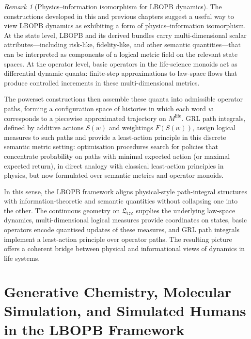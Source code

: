 \documentclass[11pt]{book}
\theoremstyle{plain}
\theoremstyle{definition}
\theoremstyle{remark}
\newtheorem{remark}[theorem]{Remark}
\newcommand{\GZLS}{\ensuremath{\mathfrak{L}_{\mathrm{GZ}}}}       \newcommand{\GZLT}{\ensuremath{M_{!w}}}                           \newcommand{\GZLOC}{\ensuremath{A_M}}                             \newcommand{\GZLCurv}{\ensuremath{\mathcal{F}_{\mathrm{law}}}}
\begin{document}
\begin{remark}[Physics--information isomorphism for LBOPB dynamics]


The constructions developed in this and previous chapters suggest a
useful way to view LBOPB dynamics as exhibiting a form of
physics--information isomorphism. At the state level, LBOPB and its
derived bundles carry multi-dimensional scalar attributes---including
risk-like, fidelity-like, and other semantic quantities—that can be
interpreted as components of a logical metric field on the relevant
state spaces. At the operator level, basic operators in the
life-science monoids act as differential dynamic quanta: finite-step
approximations to law-space flows that produce controlled increments
in these multi-dimensional metrics.

The powerset constructions then assemble these quanta into admissible
operator paths, forming a configuration space of histories in which
each word $w$ corresponds to a piecewise approximated trajectory on
$M^{\mathrm{life}}$. GRL path integrals, defined by additive actions
$S(w)$ and weightings $F(S(w))$, assign logical measures to such paths
and provide a least-action principle in this discrete semantic metric
setting: optimisation procedures search for policies that concentrate
probability on paths with minimal expected action (or maximal expected
return), in direct analogy with classical least-action principles in
physics, but now formulated over semantic metrics and operator
monoids.

In this sense, the LBOPB framework aligns physical-style path-integral
structures with information-theoretic and semantic quantities without
collapsing one into the other. The continuous geometry on $\GZLS$
supplies the underlying law-space dynamics, multi-dimensional logical
measures provide coordinates on states, basic operators encode
quantised updates of these measures, and GRL path integrals implement
a least-action principle over operator paths. The resulting picture
offers a coherent bridge between physical and informational views of
dynamics in life systems.
\end{remark}



\part[Generative Chemistry, Molecular Simulation, and Simulated Humans]{Generative Chemistry, Molecular Simulation, and Simulated Humans\\
      in the LBOPB Framework}
\end{document}
